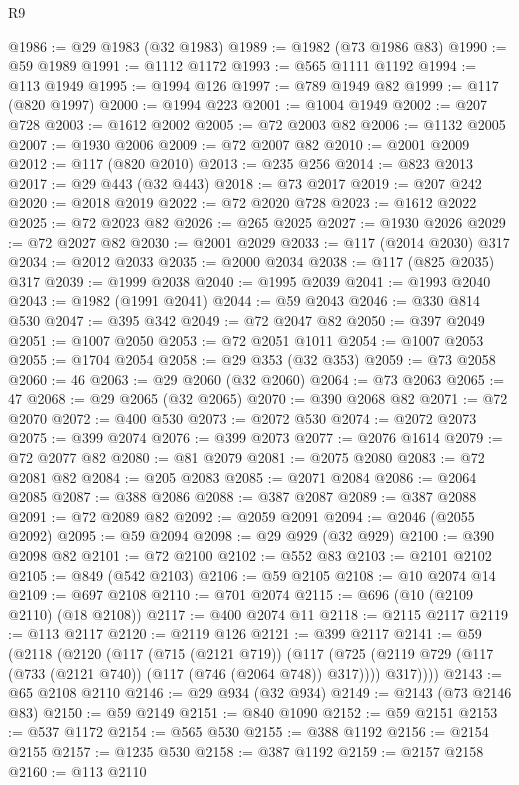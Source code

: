 \begin{lexlean}{R9}
\begin{coremodule}
@1986 := @29 @1983 (@32 @1983)
@1989 := @1982 (@73 @1986 @83)
@1990 := @59 @1989
@1991 := @1112 @1172
@1993 := @565 @1111 @1192
@1994 := @113 @1949
@1995 := @1994 @126
@1997 := @789 @1949 @82
@1999 := @117 (@820 @1997)
@2000 := @1994 @223
@2001 := @1004 @1949
@2002 := @207 @728
@2003 := @1612 @2002
@2005 := @72 @2003 @82
@2006 := @1132 @2005
@2007 := @1930 @2006
@2009 := @72 @2007 @82
@2010 := @2001 @2009
@2012 := @117 (@820 @2010)
@2013 := @235 @256
@2014 := @823 @2013
@2017 := @29 @443 (@32 @443)
@2018 := @73 @2017
@2019 := @207 @242
@2020 := @2018 @2019
@2022 := @72 @2020 @728
@2023 := @1612 @2022
@2025 := @72 @2023 @82
@2026 := @265 @2025
@2027 := @1930 @2026
@2029 := @72 @2027 @82
@2030 := @2001 @2029
@2033 := @117 (@2014 @2030) @317
@2034 := @2012 @2033
@2035 := @2000 @2034
@2038 := @117 (@825 @2035) @317
@2039 := @1999 @2038
@2040 := @1995 @2039
@2041 := @1993 @2040
@2043 := @1982 (@1991 @2041)
@2044 := @59 @2043
@2046 := @330 @814 @530
@2047 := @395 @342
@2049 := @72 @2047 @82
@2050 := @397 @2049
@2051 := @1007 @2050
@2053 := @72 @2051 @1011
@2054 := @1007 @2053
@2055 := @1704 @2054
@2058 := @29 @353 (@32 @353)
@2059 := @73 @2058
@2060 := 46
@2063 := @29 @2060 (@32 @2060)
@2064 := @73 @2063
@2065 := 47
@2068 := @29 @2065 (@32 @2065)
@2070 := @390 @2068 @82
@2071 := @72 @2070
@2072 := @400 @530
@2073 := @2072 @530
@2074 := @2072 @2073
@2075 := @399 @2074
@2076 := @399 @2073
@2077 := @2076 @1614
@2079 := @72 @2077 @82
@2080 := @81 @2079
@2081 := @2075 @2080
@2083 := @72 @2081 @82
@2084 := @205 @2083
@2085 := @2071 @2084
@2086 := @2064 @2085
@2087 := @388 @2086
@2088 := @387 @2087
@2089 := @387 @2088
@2091 := @72 @2089 @82
@2092 := @2059 @2091
@2094 := @2046 (@2055 @2092)
@2095 := @59 @2094
@2098 := @29 @929 (@32 @929)
@2100 := @390 @2098 @82
@2101 := @72 @2100
@2102 := @552 @83
@2103 := @2101 @2102
@2105 := @849 (@542 @2103)
@2106 := @59 @2105
@2108 := @10 @2074 @14
@2109 := @697 @2108
@2110 := @701 @2074
@2115 := @696 (@10 (@2109 @2110) (@18 @2108))
@2117 := @400 @2074 @11
@2118 := @2115 @2117
@2119 := @113 @2117
@2120 := @2119 @126
@2121 := @399 @2117
@2141 := @59
    (@2118
      (@2120
        (@117
          (@715 (@2121 @719))
          (@117
            (@725 (@2119 @729 (@117 (@733 (@2121 @740)) (@117 (@746 (@2064 @748)) @317))))
            @317))))
@2143 := @65 @2108 @2110
@2146 := @29 @934 (@32 @934)
@2149 := @2143 (@73 @2146 @83)
@2150 := @59 @2149
@2151 := @840 @1090
@2152 := @59 @2151
@2153 := @537 @1172
@2154 := @565 @530
@2155 := @388 @1192
@2156 := @2154 @2155
@2157 := @1235 @530
@2158 := @387 @1192
@2159 := @2157 @2158
@2160 := @113 @2110

\end{coremodule}
\end{lexlean}
